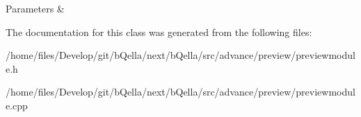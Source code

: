 \begin{DoxyParams}{Parameters}
{\em } & \\
\hline
\end{DoxyParams}


The documentation for this class was generated from the following files:\begin{DoxyCompactItemize}
\item 
/home/files/Develop/git/bQella/next/bQella/src/advance/preview/previewmodule.h\item 
/home/files/Develop/git/bQella/next/bQella/src/advance/preview/previewmodule.cpp\end{DoxyCompactItemize}
